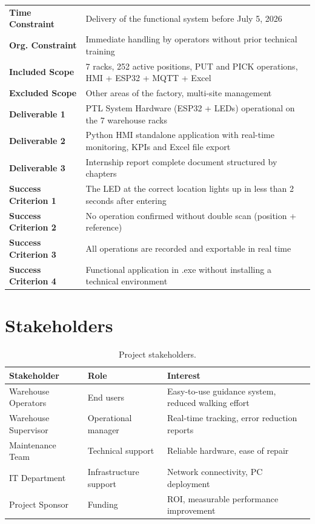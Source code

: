 \begin{longtable}{p{3.5cm} p{9cm}}
  \textbf{Time Constraint} & Delivery of the functional system before July 5, 2026 \\
  \textbf{Org. Constraint} & Immediate handling by operators without prior technical training \\
  \textbf{Included Scope} & 7 racks, 252 active positions, PUT and PICK operations, HMI + ESP32 + MQTT + Excel \\
  \textbf{Excluded Scope} & Other areas of the factory, multi-site management \\
  \textbf{Deliverable 1} & PTL System Hardware (ESP32 + LEDs) operational on the 7 warehouse racks \\
  \textbf{Deliverable 2} & Python HMI standalone application with real-time monitoring, KPIs and Excel file export \\
  \textbf{Deliverable 3} & Internship report complete document structured by chapters \\
  \textbf{Success Criterion 1} & The LED at the correct location lights up in less than 2 seconds after entering \\
  \textbf{Success Criterion 2} & No operation confirmed without double scan (position + reference) \\
  \textbf{Success Criterion 3} & All operations are recorded and exportable in real time \\
  \textbf{Success Criterion 4} & Functional application in .exe without installing a technical environment \\
\end{longtable}

\section{Stakeholders}
\label{sec:stakeholders}

\begin{table}[H]
  \centering
  \caption{Project stakeholders.}
  \label{tab:stakeholders}
  \begin{tabular}{p{3cm} p{5cm} p{5cm}}
    \toprule
    \textbf{Stakeholder} & \textbf{Role} & \textbf{Interest} \\
    \midrule
    Warehouse Operators & End users & Easy-to-use guidance system, reduced walking effort \\
    Warehouse Supervisor & Operational manager & Real-time tracking, error reduction reports \\
    Maintenance Team & Technical support & Reliable hardware, ease of repair \\
    IT Department & Infrastructure support & Network connectivity, PC deployment \\
    Project Sponsor & Funding & ROI, measurable performance improvement \\
    \bottomrule
  \end{tabular}
\end{table}

